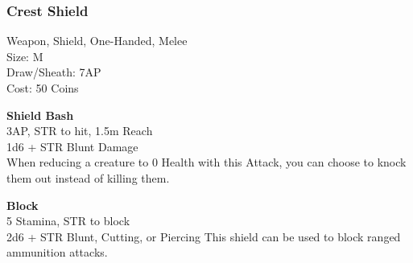 \subsubsection{Crest Shield}\label{weapon:crestShield}
Weapon, Shield, One-Handed, Melee\\
Size: M\\
Draw/Sheath: 7AP\\
Cost: 50 Coins

\textbf{Shield Bash}\\
3AP, STR to hit, 1.5m Reach\\
1d6 + \texttimes STR Blunt Damage\\
When reducing a creature to 0 Health with this Attack, you can choose to knock them out instead of killing them.

\textbf{Block}\\
5 Stamina, STR to block\\
2d6 + \texttimes STR Blunt, Cutting, or Piercing
This shield can be used to block ranged ammunition attacks.\\

